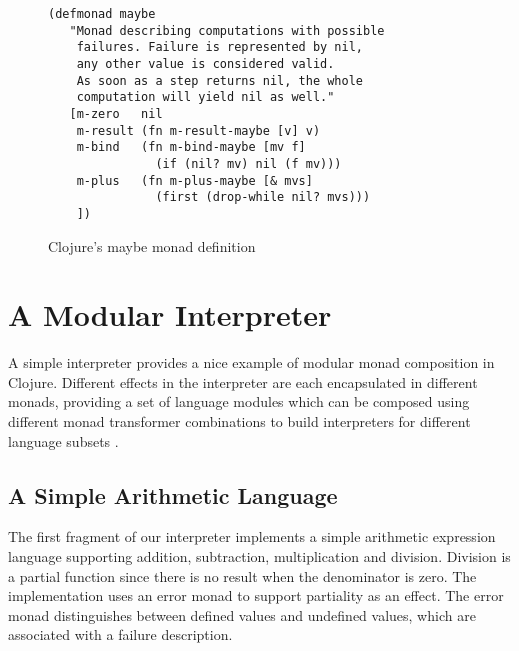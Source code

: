 \documentclass[natbib,10pt]{sigplanconf}
\begin{document}
\begin{figure}
\begin{center}
\begin{verbatim}
(defmonad maybe
   "Monad describing computations with possible
    failures. Failure is represented by nil,
    any other value is considered valid.
    As soon as a step returns nil, the whole
    computation will yield nil as well."
   [m-zero   nil
    m-result (fn m-result-maybe [v] v)
    m-bind   (fn m-bind-maybe [mv f]
               (if (nil? mv) nil (f mv)))
    m-plus   (fn m-plus-maybe [& mvs]
               (first (drop-while nil? mvs)))
    ])

\end{verbatim}
\end{center}
\caption{Clojure's maybe monad definition}
\label{fig-Clojure-maybe-defn}
\end{figure}

\section{A Modular Interpreter}

A simple interpreter provides a nice example of modular monad
composition in Clojure.  Different effects in the interpreter are each
encapsulated in different monads, providing a set of language modules
which can be composed using different monad transformer combinations
to build interpreters for different language subsets
\citep{modular-interpreters, semantic-lego}.

\subsection {A Simple Arithmetic Language}

The first fragment of our interpreter implements a simple 
arithmetic expression language supporting addition, subtraction, 
multiplication and division. Division is a partial function 
since there is no result when the denominator is zero.  The 
implementation uses an error monad to support partiality as an effect.  
The error monad distinguishes between defined values and undefined values, 
which are associated with a failure description.
\end{document}
